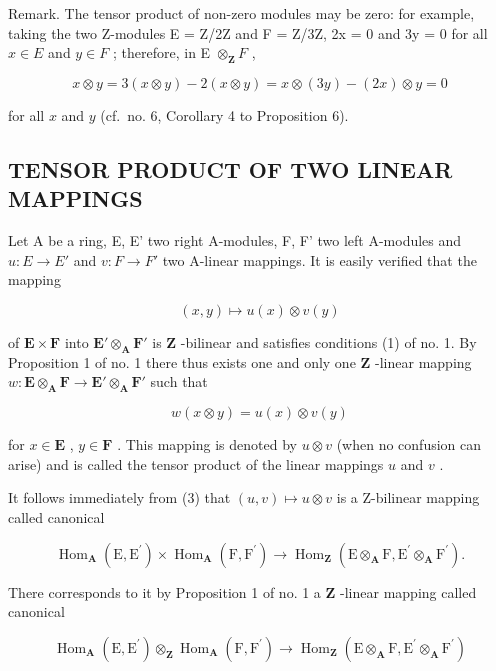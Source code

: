Remark. The tensor product of non-zero modules may be zero: for example, taking the two Z-modules E = Z/2Z and F = Z/3Z, 2x = 0 and 3y = 0 for all \(x \in E\) and \(y \in F\) ; therefore, in E \(\otimes_{\mathbf{Z}} F\) ,

\[
x \otimes y = 3 (x \otimes y) - 2 (x \otimes y) = x \otimes (3 y) - (2 x) \otimes y = 0
\]

for all \(x\) and \(y\) (cf.~no. 6, Corollary 4 to Proposition 6).

\subsection{TENSOR PRODUCT OF TWO LINEAR MAPPINGS}

Let A be a ring, E, E' two right A-modules, F, F' two left A-modules and \(u: E \rightarrow E'\) and \(v: F \rightarrow F'\) two A-linear mappings. It is easily verified that the mapping

\[
(x, y) \mapsto u (x) \otimes v (y)
\]

of \(\mathbf{E} \times \mathbf{F}\) into \(\mathbf{E}' \otimes_{\mathbf{A}} \mathbf{F}'\) is \(\mathbf{Z}\) -bilinear and satisfies conditions (1) of no. 1. By Proposition 1 of no. 1 there thus exists one and only one \(\mathbf{Z}\) -linear mapping \(w: \mathbf{E} \otimes_{\mathbf{A}} \mathbf{F} \to \mathbf{E}' \otimes_{\mathbf{A}} \mathbf{F}'\) such that

\[
w (x \otimes y) = u (x) \otimes v (y)\tag{3}
\]

for \(x \in \mathbf{E}\) , \(y \in \mathbf{F}\) . This mapping is denoted by \(u \otimes v\) (when no confusion can arise) and is called the tensor product of the linear mappings \(u\) and \(v\) .

It follows immediately from (3) that \((u, v) \mapsto u \otimes v\) is a Z-bilinear mapping called canonical

\[
\operatorname{Hom} _ {\mathbf {A}} (\mathrm{E}, \mathrm{E} ^ {\prime}) \times \operatorname{Hom} _ {\mathbf {A}} (\mathrm{F}, \mathrm{F} ^ {\prime}) \rightarrow \operatorname{Hom} _ {\mathbf {Z}} (\mathrm{E} \otimes_ {\mathbf {A}} \mathrm{F}, \mathrm{E} ^ {\prime} \otimes_ {\mathbf {A}} \mathrm{F} ^ {\prime}).
\]

There corresponds to it by Proposition 1 of no. 1 a \(\mathbf{Z}\) -linear mapping called canonical

\[
\operatorname{Hom} _ {\mathbf {A}} (\mathrm{E}, \mathrm{E} ^ {\prime}) \otimes_ {\mathbf {Z}} \operatorname{Hom} _ {\mathbf {A}} (\mathrm{F}, \mathrm{F} ^ {\prime}) \rightarrow \operatorname{Hom} _ {\mathbf {Z}} (\mathrm{E} \otimes_ {\mathbf {A}} \mathrm{F}, \mathrm{E} ^ {\prime} \otimes_ {\mathbf {A}} \mathrm{F} ^ {\prime})\tag{4}
\]

